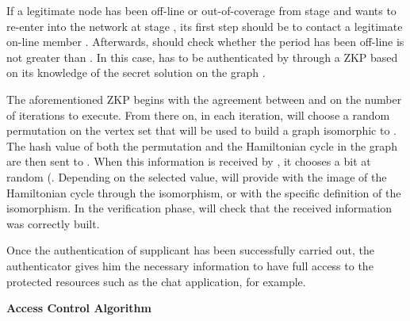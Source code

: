 \documentclass{article}
\begin{document}
If a legitimate node  has been off-line
or out-of-coverage from stage  and wants to re-enter into the
network at stage , its first step should be to contact a
legitimate on-line member . Afterwards,  should check
whether the period  has been off-line is not greater than . In
this case,  has to be authenticated by  through a ZKP based on its
knowledge of the secret solution  on the graph .

The aforementioned ZKP begins with the agreement between  and
 on the number of iterations  to execute. From there on, in
each iteration,  will choose a random permutation
 on the vertex set that will be used to build a
graph  isomorphic to . The hash value of both the
permutation  and the Hamiltonian cycle in the
graph   are then sent to . When this
information is received by , it chooses a bit  at random
(. Depending on the selected
value,  will provide  with the image  of the Hamiltonian
cycle through the isomorphism, or with the specific definition of
the isomorphism. In the verification phase,  will check that
the received information was correctly built.

Once the authentication of supplicant  has been successfully
carried out, the authenticator  gives him the necessary
information to have full access to the protected resources such as
the chat application, for example.

{\bf Access Control Algorithm}
\end{document}
